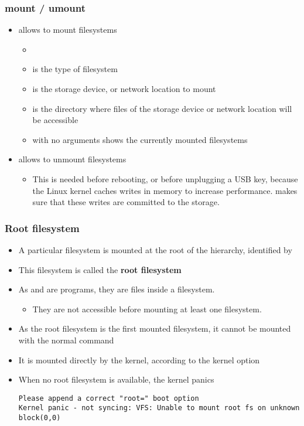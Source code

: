 \begin{frame}
  \frametitle{mount / umount}
  \begin{itemize}
  \item {} allows to mount filesystems
    \begin{itemize}
    \item {}
    \item {} is the type of filesystem
    \item {} is the storage device, or network location to
      mount
    \item {} is the directory where files of the
      storage device or network location will be accessible
    \item {} with no arguments shows the currently mounted
      filesystems
    \end{itemize}
  \item {} allows to unmount filesystems
    \begin{itemize}
    \item This is needed before rebooting, or before unplugging a USB
      key, because the Linux kernel caches writes in memory to
      increase performance.  makes sure that these writes are
      committed to the storage.
    \end{itemize}
  \end{itemize}
\end{frame}

\begin{frame}[fragile]
  \frametitle{Root filesystem}
  \begin{itemize}
  \item A particular filesystem is mounted at the root of the hierarchy,
    identified by \code{/}
  \item This filesystem is called the {\bf root filesystem}
  \item As  and  are programs, they are files
    inside a filesystem.
    \begin{itemize}
    \item They are not accessible before mounting at least one filesystem.
    \end{itemize}
  \item As the root filesystem is the first mounted filesystem, it
    cannot be mounted with the normal  command
  \item It is mounted directly by the kernel, according to the
     kernel option
  \item When no root filesystem is available, the kernel panics\\
    \tiny
\begin{verbatim}
Please append a correct "root=" boot option
Kernel panic - not syncing: VFS: Unable to mount root fs on unknown block(0,0)
\end{verbatim}
  \end{itemize}
\end{frame}

